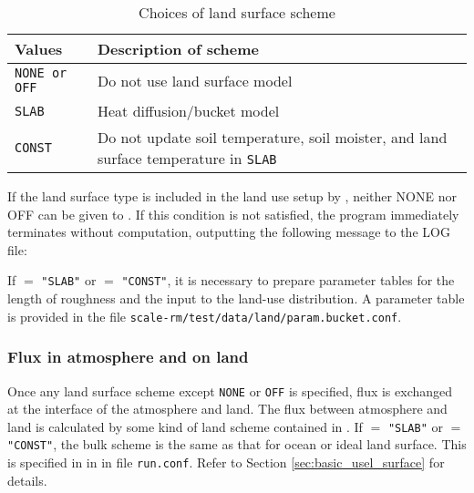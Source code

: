 \begin{table}[hbt]
\begin{center}
  \caption{Choices of land surface scheme}
  \label{tab:nml_land}
  \begin{tabularx}{150mm}{lX} \hline
    \rowcolor[gray]{0.9}  Values & Description of scheme \\ \hline
      \verb|NONE or OFF| & Do not use land surface model              \\
      \verb|SLAB|          & Heat diffusion/bucket model                   \\
      \verb|CONST|         & Do not update soil temperature, soil moister, and land surface temperature in \verb|SLAB| \\
    \hline
  \end{tabularx}
\end{center}
\end{table}

If the land surface type is included in the land use setup by , neither NONE nor OFF can be given to . If this condition is not satisfied, the program immediately terminates without computation, outputting the following message to the LOG file:

If  $=$ \verb|"SLAB"| or  $=$ \verb|"CONST"|,
it is necessary to prepare parameter tables for the length of roughness and the input to the land-use distribution.
A parameter table is provided
in the file \verb|scale-rm/test/data/land/param.bucket.conf|.\\


\subsubsection{Flux in atmosphere and on land}
Once any land surface scheme except \verb|NONE| or \verb|OFF| is specified, flux is exchanged at the interface of the atmosphere and land. The flux between atmosphere and land is calculated by some kind of land scheme contained in \scalerm. If  $=$ \verb|"SLAB"| or  $=$ \verb|"CONST"|, the bulk scheme is the same as that for ocean or ideal land surface. This is specified in  in  in file \verb|run.conf|. Refer to Section \ref{sec:basic_usel_surface} for details.

